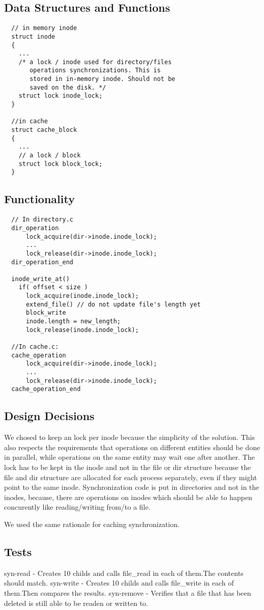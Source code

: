 \subsection{Data Structures and Functions}
  
\begin{lstlisting}
  // in memory inode 
  struct inode 
  {
    ...
    /* a lock / inode used for directory/files
       operations synchronizations. This is 
       stored in in-memory inode. Should not be
       saved on the disk. */
    struct lock inode_lock; 
  }

  //in cache
  struct cache_block
  {
    ... 
    // a lock / block 
    struct lock block_lock;
  }

\end{lstlisting}

\subsection{Functionality}
  
\begin{lstlisting}
  // In directory.c
  dir_operation
      lock_acquire(dir->inode.inode_lock);
      ...
      lock_release(dir->inode.inode_lock);
  dir_operation_end

  inode_write_at()
    if( offset < size )
      lock_acquire(inode.inode_lock);
      extend_file() // do not update file's length yet
      block_write
      inode.length = new_length;
      lock_release(inode.inode_lock);
    
  //In cache.c:
  cache_operation
      lock_acquire(dir->inode.inode_lock);
      ...
      lock_release(dir->inode.inode_lock);
  cache_operation_end

\end{lstlisting}

\subsection{Design Decisions}
  
We chosed to keep an lock per inode because the simplicity of the solution. This also respects the requirements that operations on different entities should be done in parallel, while operations on the same entity may wait one after another. The lock has to be kept in the inode and not in the file or dir structure because the file and dir structure are allocated for each process separately, even if they might point to the same inode.
Synchronization code is put in directories and not in the inodes, because, there are operations on inodes which should be able to happen concurently like reading/writing from/to a file.

We used the same rationale for caching synchronization.

\subsection{Tests}

syn-read - Creates 10 childs and calls file\_read in each of them.The contents should match.
syn-write - Creates 10 childs and calls file\_write in each of them.Then compares the results.
syn-remove - Verifies that a file that has been deleted is still able to be readen or written to.